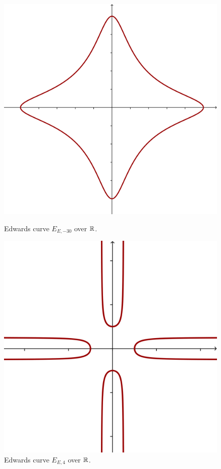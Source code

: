 \begin{figure}[htp]
\begin{minipage}[b]{0.5\linewidth}
\centering
\includegraphics[scale=0.2]{edwards_curve_negative.png}
\caption{Edwards curve $E_{E,-30}$ over $\mathbb{R}$.}
\end{minipage}
\hspace{0.5cm}
\begin{minipage}[b]{0.5\linewidth}
\centering
\includegraphics[scale=0.5]{edwards_curve_positive.png}
\caption{Edwards curve $E_{E,4}$ over $\mathbb{R}$.}
\end{minipage}
\end{figure}
